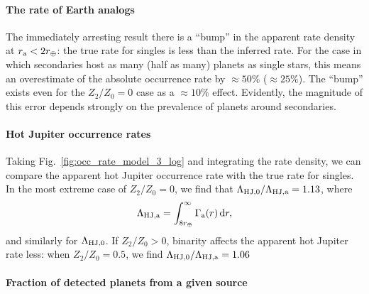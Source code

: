 \documentclass[12pt,modern]{aastex61}
\renewcommand{\a}{_{\rm a}}
\begin{document}
\paragraph{The rate of Earth analogs}
The immediately arresting result there is a ``bump'' in the apparent rate 
density at $r\a < 2r_\oplus$: the true rate for singles is less than the 
inferred rate.
For the case in which secondaries host as many (half as many) planets as 
single stars, this means an overestimate of the absolute occurrence rate by 
$\approx 50\%$ ($\approx 25\%$).
The ``bump'' exists even for the $Z_2/Z_0=0$ case as a $\approx 10\%$ effect.
Evidently, the magnitude of this error depends strongly on the prevalence of 
planets around secondaries.

\paragraph{Hot Jupiter occurrence rates}
Taking Fig.~\ref{fig:occ_rate_model_3_log} and integrating the rate density, 
we can compare the apparent hot Jupiter 
occurrence rate with the true rate for singles.
In the most extreme case of $Z_2/Z_0=0$, we find that $\Lambda_{{\rm 
HJ},0}/\Lambda_{\rm HJ,a} = 1.13$, where
\begin{equation}
\Lambda_{\rm HJ,a} = \int_{8r_\oplus}^{\infty} \Gamma\a(r)\,{\rm d}r,
\end{equation}
and similarly for $\Lambda_{\rm HJ,0}$.
If $Z_2/Z_0>0$, binarity affects the apparent hot Jupiter rate less: when 
$Z_2/Z_0=0.5$, we find $\Lambda_{{\rm HJ},0}/\Lambda_{\rm HJ,a} = 1.06$

\paragraph{Fraction of detected planets from a given source}
\end{document}
